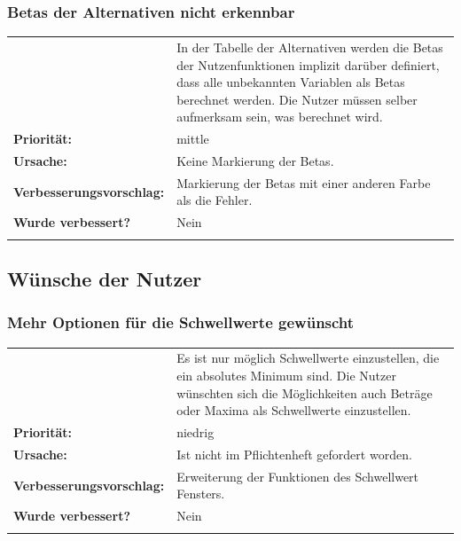 \documentclass{article}
\begin{document}
\subsubsection*{Betas der Alternativen nicht erkennbar}
\begin{tabular}{ll}
\begin{tabularx}{\textwidth}{rX}
    \textbf{Beschreibung:} & In der Tabelle der Alternativen werden die Betas der Nutzenfunktionen implizit darüber definiert, dass alle unbekannten Variablen als Betas berechnet werden. Die Nutzer müssen selber aufmerksam sein, was berechnet wird.\\
    \textbf{Priorität:} & mittle\\
    \textbf{Ursache:} & Keine Markierung der Betas. \\
    \textbf{Verbesserungsvorschlag:} & Markierung der Betas mit einer anderen Farbe als die Fehler.\\
    \textbf{Wurde verbessert?} & Nein\\
\end{tabularx}
\end{tabular}


\subsection{Wünsche der Nutzer}

\subsubsection*{Mehr Optionen für die Schwellwerte gewünscht}
\begin{tabular}{ll}
\begin{tabularx}{\textwidth}{rX}
    \textbf{Beschreibung:} & Es ist nur möglich Schwellwerte einzustellen, die ein absolutes Minimum sind. Die Nutzer wünschten sich die Möglichkeiten auch Beträge oder Maxima als Schwellwerte einzustellen.\\
    \textbf{Priorität:} & niedrig\\
    \textbf{Ursache:} & Ist nicht im Pflichtenheft gefordert worden. \\
    \textbf{Verbesserungsvorschlag:} & Erweiterung der Funktionen des Schwellwert Fensters.\\
    \textbf{Wurde verbessert?} & Nein\\
    \end{tabularx}
\end{tabular}
\end{document}
